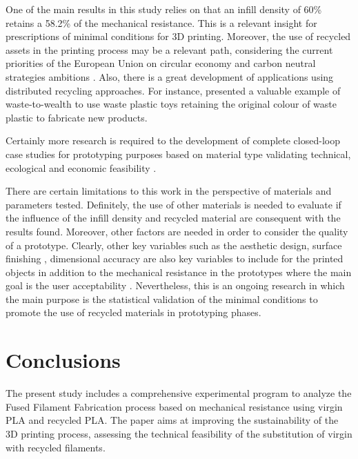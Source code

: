 \documentclass[]{interact}
\theoremstyle{plain}%
\theoremstyle{definition}
\theoremstyle{remark}
\begin{document}
One of the main results in this study relies on that an infill density
of 60\% retains a 58.2\% of the mechanical resistance. This is a
relevant insight for prescriptions of minimal conditions for 3D
printing. Moreover, the use of recycled assets in the printing process
may be a relevant path, considering the current priorities of the
European Union on circular economy and carbon neutral strategies
ambitions \citep{Schwarz2021}. Also, there is a great development of
applications using distributed recycling approaches. For instance,
\citet{Nur-A-Tomal2020} presented a valuable example of waste-to-wealth
to use waste plastic toys retaining the original colour of waste plastic
to fabricate new products.

Certainly more research is required to the development of complete
closed-loop case studies for prototyping purposes based on material type
validating technical, ecological and economic feasibility
\citep{CruzSanchez2020, Sauerwein2019}.

There are certain limitations to this work in the perspective of
materials and parameters tested. Definitely, the use of other materials
is needed to evaluate if the influence of the infill density and
recycled material are consequent with the results found. Moreover, other
factors are needed in order to consider the quality of a prototype.
Clearly, other key variables such as the aesthetic design, surface
finishing \citep{Jin2017}, dimensional accuracy are also key variables
to include for the printed objects in addition to the mechanical
resistance in the prototypes where the main goal is the user
acceptability \citep{Sauer2009, Sauer2010}. Nevertheless, this is an
ongoing research in which the main purpose is the statistical validation
of the minimal conditions to promote the use of recycled materials in
prototyping phases.

\hypertarget{conclusions}{%
\section{Conclusions}\label{conclusions}}

\label{section:conclusions}

The present study includes a comprehensive experimental program to
analyze the Fused Filament Fabrication process based on mechanical
resistance using virgin PLA and recycled PLA. The paper aims at
improving the sustainability of the 3D printing process, assessing the
technical feasibility of the substitution of virgin with recycled
filaments.
\end{document}
